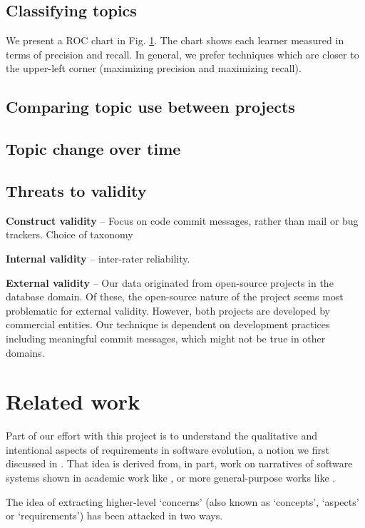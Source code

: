 \documentclass[10pt, conference, compsocconf]{IEEEtran}
\begin{document}
\subsection{Classifying topics}
We present a ROC chart in Fig. \ref{}. The chart shows each learner measured in terms of precision and recall. In general, we prefer techniques which are closer to the upper-left corner (maximizing precision and maximizing recall). 

\subsection{Comparing topic use between projects}

\subsection{Topic change over time}

\subsection{Threats to validity}
\textbf{Construct validity} – Focus on code commit messages, rather than mail or bug trackers. Choice of taxonomy

\textbf{Internal validity} -- inter-rater reliability.

\textbf{External validity} – Our data originated from open-source projects in the database domain. Of these, the open-source nature of the project seems most problematic for external validity. However, both projects are developed by commercial entities. Our technique is dependent on development practices including meaningful commit messages, which might not be true in other domains.

\section{Related work}
Part of our effort with this project is to understand the qualitative and intentional aspects of requirements in software evolution, a notion we first discussed in \cite{ernst07icsm}. That idea is derived from, in part, work on narratives of software systems shown in academic work like \cite{anton01}, or more general-purpose works like \cite{waldo93}.

The idea of extracting higher-level `concerns' (also known as `concepts', `aspects' or `requirements') has been attacked in two ways.
\end{document}

